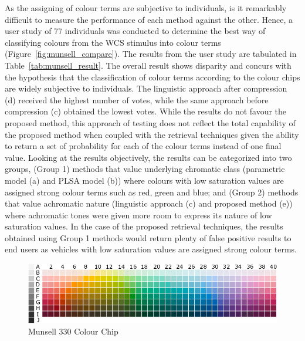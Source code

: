 As the assigning of colour terms are subjective to individuals, is it remarkably difficult to measure the performance of each method against the other. Hence, a user study of 77 individuals was conducted to determine the best way of classifying colours from the WCS stimulus into colour terms (Figure~\ref{fig:munsell_compare}). The results from the user study are tabulated in Table~\ref{tab:munsell_result}.
The overall result shows disparity and concurs with the hypothesis that the classification of colour terms according to the colour chips are widely subjective to individuals.
The linguistic approach after compression (d) received the highest number of votes, while the same approach before compression (c) obtained the lowest votes.
While the results do not favour the proposed method, this approach of testing does not reflect the total capability of the proposed method when coupled with the retrieval techniques given the ability to return a set of probability for each of the colour terms instead of one final value.
Looking at the results objectively, the results can be categorized into two groups, (Group 1) methods that value underlying chromatic class (parametric model (a) and PLSA model (b)) where colours with low saturation values are assigned strong colour terms such as red, green and blue;
and (Group 2) methods that value achromatic nature (linguistic approach (c) and proposed method (e)) where achromatic tones were given more room to express its nature of low saturation values.
In the case of the proposed retrieval techniques, the results obtained using Group 1 methods would return plenty of false positive results to end users as vehicles with low saturation values are assigned strong colour terms.

\begin{figure}[hbt!]\centering
\includegraphics[width=.9\textwidth]{image/analysis/munsell_o.png}
\caption{Munsell 330 Colour Chip}
\label{fig:munsell_ori330}
\end{figure}


